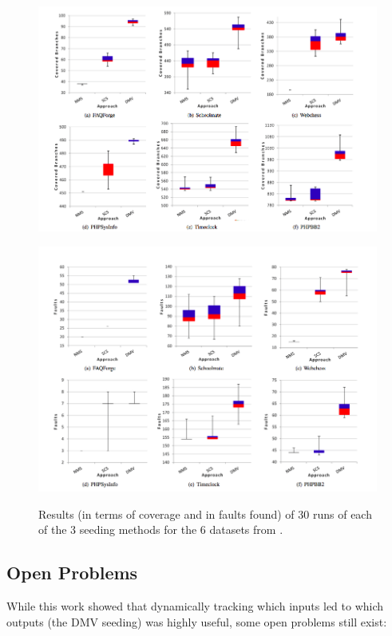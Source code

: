 \documentclass{sig-alternate-05-2015}
\begin{document}
\begin{figure}
\centering
\includegraphics[width=6in]{images/results1.png}
\vspace{0.5in}

\includegraphics[width=6in]{images/results2.png}
\label{fig:results}
\caption{Results (in terms of coverage and in faults found) of 30 runs of each of the 3 seeding methods for the 6 datasets from \cite{alshahwan2011automated}.}
\end{figure}

\subsection{Open Problems}
While this work showed that dynamically tracking which inputs led to which outputs (the DMV seeding) was highly useful, some open problems still exist:
\end{document}
